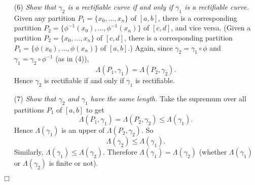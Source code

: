 \documentclass{article}
\begin{document}
\begin{enumerate}
  \item[(6)]
  \emph{Show that $\gamma_2$ is a rectifiable curve if and only if
  $\gamma_1$ is a rectifiable curve.}
  Given any partition $P_1 = \{x_0, \ldots, x_n\}$ of $[a,b]$,
  there is a corresponding partition
  $P_2 = \{ \phi^{-1}(x_0), \ldots, \phi^{-1}(x_n) \}$ of $[c,d]$,
  and vice versa.
  (Given a partition $P_2 = \{x_0, \ldots, x_n\}$ of $[c,d]$,
  there is a corresponding partition
  $P_1 = \{ \phi(x_0), \ldots, \phi(x_n) \}$ of $[a,b]$.)
  Again, since $\gamma_2 = \gamma_1 \circ \phi$ and $\gamma_1 = \gamma_2 \circ \phi^{-1}$
  (as in (4)),
  \[
    \Lambda(P_1, \gamma_1) = \Lambda(P_2, \gamma_2).
  \]
  Hence $\gamma_2$ is rectifiable if and only if $\gamma_1$ is rectifiable.

  \item[(7)]
  \emph{Show that $\gamma_2$ and $\gamma_1$ have the same length.}
  Take the supremum over all partitions $P_1$ of $[a,b]$ to get
  \[
    \Lambda(P_1, \gamma_1) = \Lambda(P_2, \gamma_2) \leq \Lambda(\gamma_1).
  \]
  Hence $\Lambda(\gamma_1)$ is an upper of $\Lambda(P_2, \gamma_2)$.
  So
  \[
    \Lambda(\gamma_2) \leq \Lambda(\gamma_1).
  \]
  Similarly, $\Lambda(\gamma_1) \leq \Lambda(\gamma_2)$.
  Therefore $\Lambda(\gamma_1) = \Lambda(\gamma_2)$
  (whether $\Lambda(\gamma_1)$ or $\Lambda(\gamma_2)$ is finite or not).
\end{enumerate}
$\Box$ \\\\



\end{document}
